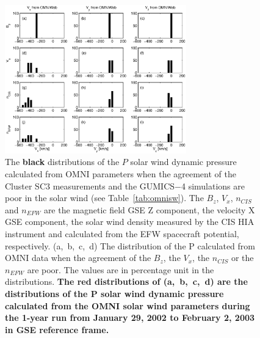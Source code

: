 \documentclass[linenumbers,draft]{agujournal}
\begin{document}
\begin{figure}[h]
\centering
\includegraphics[width=0.7\textwidth,angle=0]{swe-2020-corr-f15}  
\caption{The \textbf{black} distributions of the $P$ solar wind dynamic pressure calculated from OMNI parameters when the agreement of the Cluster SC3 measurements and the GUMICS$-$4 simulations are poor in the solar wind (see Table~\ref{tab:omnisw}). The $B_{z}$, $V_{x}$, $n_{CIS}$ and $n_{EFW}$ are the magnetic field GSE Z component, the velocity X GSE component, the solar wind density measured by the CIS HIA instrument and calculated from the EFW spacecraft potential, respectively. (a,~b,~c,~d) The distribution of the P calculated from OMNI data when the agreement of the $B_{z}$, the $V_{x}$, the $n_{CIS}$ or the $n_{EFW}$ are poor. The values are in percentage unit in the distributions. \textbf{The red distributions of (a,~b,~c,~d) are the distributions of the P solar wind dynamic pressure calculated from the OMNI solar wind parameters during the 1-year run from January 29, 2002 to February 2, 2003 in GSE reference frame.}}
\label{fig:swomnip}
\end{figure}

\pagebreak
\end{document}
